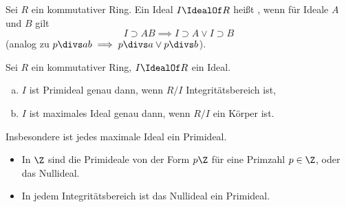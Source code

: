\begin{df*}
	Sei $R$ ein kommutativer Ring.
	Ein Ideal $I \IdealOf R$ heißt , wenn für Ideale $A$ und $B$ gilt
	\[
		I \supset A B \implies I \supset A \lor I \supset B
	\]
	(analog zu $p \divs ab \implies p\divs a \lor p \divs b$).
\end{df*}

\begin{lem} \label{8.13}
	Sei $R$ ein kommutativer Ring, $I \IdealOf R$ ein Ideal.
	\begin{enumerate}[a)]
		\item
			$I$ ist Primideal genau dann, wenn $R / I$ Integritätsbereich ist,
		\item
			$I$ ist maximales Ideal genau dann, wenn $R / I$ ein Körper ist.
	\end{enumerate}
	Insbesondere ist jedes maximale Ideal ein Primideal.
\end{lem}

\begin{nt} \label{8.14}
	\begin{itemize}
		\item
			In $\Z$ sind die Primideale von der Form $p\Z$ für eine Primzahl $p \in \Z$, oder das Nullideal.
		\item
			In jedem Integritätsbereich ist das Nullideal ein Primideal.
	\end{itemize}
\end{nt}


